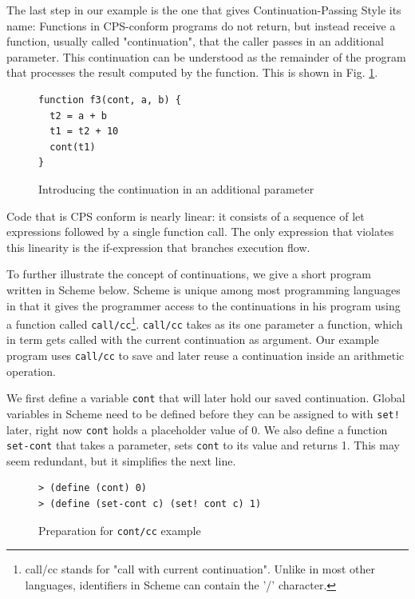 \documentclass[11pt]{report}
\begin{document}
The last step in our example is the one that gives Continuation-Passing Style its name: Functions in CPS-conform programs do not return, but instead receive a function, usually called "continuation", that the caller passes in an additional parameter. This continuation can be understood as the remainder of the program that processes the result computed by the function. This is shown in Fig. \ref{cpsconvfunc4}.

\begin{figure}[ht]
\begin{lstlisting}
function f3(cont, a, b) {
  t2 = a + b
  t1 = t2 + 10
  cont(t1)
}
\end{lstlisting}
\caption{Introducing the continuation in an additional parameter}
\label{cpsconvfunc4}
\end{figure}

Code that is CPS conform is nearly linear: it consists of a sequence of let expressions followed by a single function call. The only expression that violates this linearity is the if-expression that branches execution flow.

To further illustrate the concept of continuations, we give a short program written in Scheme below. Scheme is unique among most programming languages in that it gives the programmer access to the continuations in his program using a function called \texttt{call/cc}\footnote{call/cc stands for "call with current continuation". Unlike in most other languages, identifiers in Scheme can contain the '/' character.}. \texttt{call/cc} takes as its one parameter a function, which in term gets called with the current continuation as argument. Our example program uses \texttt{call/cc} to save and later reuse a continuation inside an arithmetic operation.

We first define a variable \texttt{cont} that will later hold our saved continuation. Global variables in Scheme need to be defined before they can be assigned to with \texttt{set!} later, right now \texttt{cont} holds a placeholder value of 0. We also define a function \texttt{set-cont} that takes a parameter, sets \texttt{cont} to its value and returns 1. This may seem redundant, but it simplifies the next line.
\begin{figure}[ht]
\begin{lstlisting}
> (define (cont) 0)
> (define (set-cont c) (set! cont c) 1)
\end{lstlisting}
\caption{Preparation for \texttt{cont/cc} example}
\label{contcc1}
\end{figure}
\end{document}
